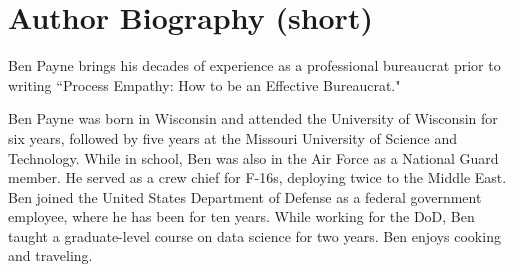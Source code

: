 \section*{Author Biography (short)}

Ben Payne brings his decades of experience as a professional bureaucrat prior to writing ``Process Empathy: How to be an Effective Bureaucrat."

Ben Payne was born in Wisconsin and attended the University of Wisconsin for six years, followed by five years at the Missouri University of Science and Technology. While in school, Ben was also in the Air Force as a National Guard member. He served as a crew chief for F-16s, deploying twice to the Middle East. Ben joined the United States Department of Defense as a federal government employee, where he has been for ten years. While working for the DoD, Ben taught a graduate-level course on data science for two years. Ben enjoys cooking and traveling. 


